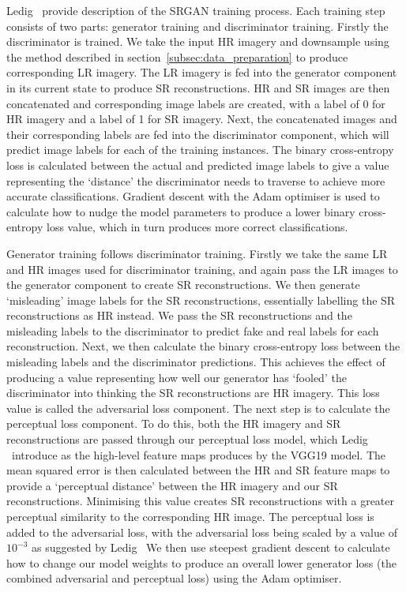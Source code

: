 Ledig \etal \ provide description of the SRGAN training process. Each training step consists of two parts: generator training and discriminator training. Firstly the discriminator is trained. We take the input HR imagery and downsample using the method described in section~\ref{subsec:data_preparation} to produce corresponding LR imagery. The LR imagery is fed into the generator component in its current state to produce SR reconstructions. HR and SR images are then concatenated and corresponding image labels are created, with a label of 0 for HR imagery and a label of 1 for SR imagery. Next, the concatenated images and their corresponding labels are fed into the discriminator component, which will predict image labels for each of the training instances. The binary cross-entropy loss is calculated between the actual and predicted image labels to give a value representing the `distance' the discriminator needs to traverse to achieve more accurate classifications. Gradient descent with the Adam optimiser is used to calculate how to nudge the model parameters to produce a lower binary cross-entropy loss value, which in turn produces more correct classifications.

Generator training follows discriminator training. Firstly we take the same LR and HR images used for discriminator training, and again pass the LR images to the generator component to create SR reconstructions. We then generate `misleading' image labels for the SR reconstructions, essentially labelling the SR reconstructions as HR instead. We pass the SR reconstructions and the misleading labels to the discriminator to predict fake and real labels for each reconstruction. Next, we then calculate the binary cross-entropy loss between the misleading labels and the discriminator predictions. This achieves the effect of producing a value representing how well our generator has `fooled' the discriminator into thinking the SR reconstructions are HR imagery. This loss value is called the adversarial loss component. The next step is to calculate the perceptual loss component. To do this, both the HR imagery and SR reconstructions are passed through our perceptual loss model, which Ledig \etal \ introduce as the high-level feature maps produces by the VGG19 model. The mean squared error is then calculated between the HR and SR feature maps to provide a `perceptual distance' between the HR imagery and our SR reconstructions. Minimising this value creates SR reconstructions with a greater perceptual similarity to the corresponding HR image. The perceptual loss is added to the adversarial loss, with the adversarial loss being scaled by a value of $10^{-3}$ as suggested by Ledig \etal \ We then use steepest gradient descent to calculate how to change our model weights to produce an overall lower generator loss (the combined adversarial and perceptual loss) using the Adam optimiser.

